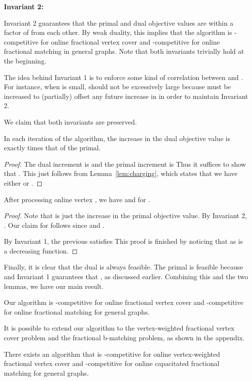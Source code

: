 \documentclass{article}
\begin{document}
\textbf{Invariant 2:} 

Invariant 2 guarantees that the primal and dual objective values are within a factor of  from each other. By weak duality, this implies that the algorithm is -competitive for online fractional vertex cover and -competitive for online fractional matching in general graphs.
Note that both invariants trivially hold at the beginning. 

The idea behind Invariant 1 is to enforce some kind of correlation between  and . For instance, when  is small,  should not be excessively large because  must be increased to (partially) offset any future increase in  in order to maintain Invariant 2.



We claim that both invariants are preserved.
\begin{lemma}[Invariant 2]
\label{lem:inv2}
In each iteration of the algorithm, the increase in the dual objective value is exactly  times that of the primal.
\end{lemma}
\begin{proof}
The dual increment is  and the primal increment is 
Thus it suffices to show that . This just follows from Lemma~\ref{lem:charging}, which states that we have either  or .
\end{proof}
\begin{lemma}[Invariant 1]
\label{lem:inv1}
After processing online vertex , we have  and  for .
\end{lemma}
\begin{proof}
Note that  is just the increase in the primal objective value. By Invariant 2, . Our claim for  follows since  and .

By Invariant 1, the previous  satisfies 
This proof is finished by noticing that  as  is a decreasing function.
\end{proof}

Finally, it is clear that the dual is always feasible. The primal is feasible because  and Invariant 1 guarantees that , as discussed earlier. Combining this and the two lemmas, we have our main result.
\begin{theorem}
\label{thm:pdgeneral}
Our algorithm is -competitive for online fractional vertex cover and -competitive for online fractional matching for general graphs.
\end{theorem}


It is possible to extend our algorithm to the vertex-weighted fractional vertex cover problem and the fractional b-matching problem, as shown in the appendix.
\begin{theorem}
\label{thm:vertexweighted}
There exists an algorithm that is -competitive for online vertex-weighted fractional vertex cover and -competitive for online capacitated fractional matching for general graphs.
\end{theorem}
\end{document}
